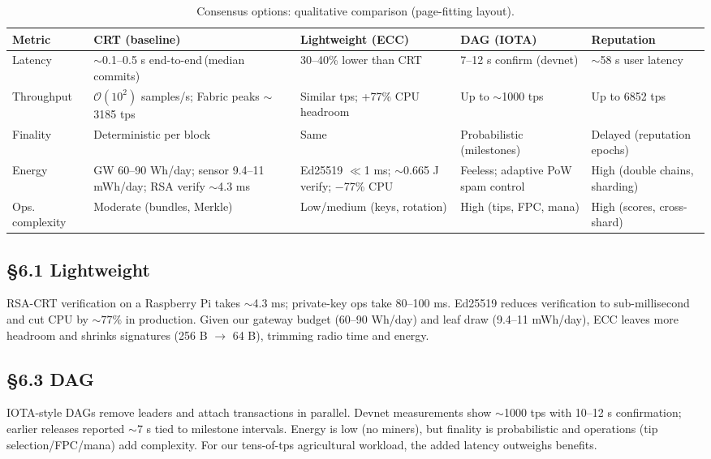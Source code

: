 \documentclass[12pt,onecolumn]{IEEEtran} %
\begin{document}
\begingroup
\setlength{\tabcolsep}{3pt}\footnotesize
\begin{table}[ht]
  \centering
  \caption{Consensus options: qualitative comparison (page-fitting layout).}
  \label{tab:comparison-matrix}
  \begin{tabularx}{\textwidth}{lXXXX}
    \toprule
    \textbf{Metric} & \textbf{CRT (baseline)} & \textbf{Lightweight (ECC)} & \textbf{DAG (IOTA)} & \textbf{Reputation} \\
    \midrule
    Latency & \(\sim\)0.1–0.5 s end-to-end\footnotesize\,(median commits) & 30–40\% lower than CRT & 7–12 s confirm (devnet) & \(\sim\)58 s user latency \\
    Throughput & \(\mathcal{O}(10^2)\) samples/s; Fabric peaks \(\sim\)3185 tps & Similar tps; +77\% CPU headroom & Up to \(\sim\)1000 tps & Up to 6852 tps \\
    Finality & Deterministic per block & Same & Probabilistic (milestones) & Delayed (reputation epochs) \\
    Energy & GW 60–90 Wh/day; sensor 9.4–11 mWh/day; RSA verify \(\sim\)4.3 ms & Ed25519 \(\ll\)1 ms; \(\sim\)0.665 J verify; −77\% CPU & Feeless; adaptive PoW spam control & High (double chains, sharding) \\
    Ops. complexity & Moderate (bundles, Merkle) & Low/medium (keys, rotation) & High (tips, FPC, mana) & High (scores, cross-shard) \\
    \bottomrule
  \end{tabularx}
\end{table}
\endgroup

\subsection{\S6.1 Lightweight}
RSA-CRT verification on a Raspberry Pi takes \(\sim\)4.3 ms; private-key ops take 80–100 ms. Ed25519 reduces verification to sub-millisecond and cut CPU by \(\sim77\%\) in production. Given our gateway budget (60–90 Wh/day) and leaf draw (9.4–11 mWh/day), ECC leaves more headroom and shrinks signatures (256 B \(\to\) 64 B), trimming radio time and energy.

\subsection{\S6.3 DAG}
IOTA-style DAGs remove leaders and attach transactions in parallel. Devnet measurements show \(\sim\)1000 tps with 10–12 s confirmation; earlier releases reported \(\sim\)7 s tied to milestone intervals. Energy is low (no miners), but finality is probabilistic and operations (tip selection/FPC/mana) add complexity. For our tens-of-tps agricultural workload, the added latency outweighs benefits.
\end{document}
